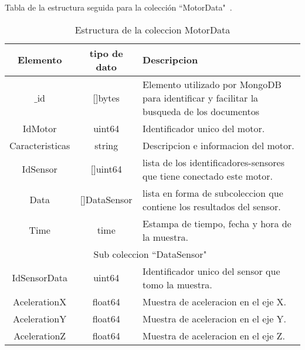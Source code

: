    \begin{table}[h!]
        \begin{center}
            Tabla de la estructura seguida para la colección ``MotorData"\ .\\

            \vspace{0.3cm}
            \begin{tabular}{|c|c|p{9cm}|}
                \hline
                Elemento        & tipo de dato & Descripcion \\\hline\hline
                $\_$id      & []bytes  & Elemento utilizado por MongoDB para
                identificar y facilitar la busqueda de los documentos\\\hline
                IdMotor         & uint64   & Identificador unico del motor.\\\hline
                Caracteristicas & string   & Descripcion e informacion del motor.\\\hline
                IdSensor        & []uint64 & lista de los identificadores-sensores
                que tiene conectado este motor.\\\hline
                Data            & []DataSensor & lista en forma de subcoleccion
                que contiene los resultados del sensor.\\\hline
                Time            & time  & Estampa de tiempo, fecha y hora de la muestra.\\\hline
                \hline
                \multicolumn{3}{|c|}{Sub coleccion  ``DataSensor"\ }\\\hline\hline
                IdSensorData & uint64 & Identificador unico del sensor que tomo la muestra.\\\hline
                AcelerationX & float64 & Muestra de aceleracion en el eje X.\\\hline
                AcelerationY & float64 & Muestra de aceleracion en el eje Y.\\\hline
                AcelerationZ & float64 & Muestra de aceleracion en el eje Z.\\
                \hline
            \end{tabular}
        \end{center}
        \caption[Estructura de MotorData]{Estructura de la coleccion MotorData}
        \label{tab:MotorDatabson}
    \end{table}


